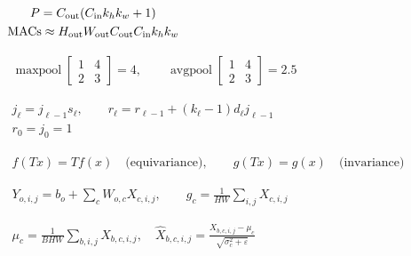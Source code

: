 \documentclass[border=4pt,multi=preview]{standalone}
\begin{document}
\begin{preview}\color{ink}\fontsize{24}{30}\selectfont
$\displaystyle \begin{gathered}P=C_{\rm out}(C_{\rm in}k_hk_w+1)\\\operatorname{MACs}\approx H_{\rm out}W_{\rm out}C_{\rm out}C_{\rm in}k_hk_w\end{gathered}$
\end{preview}
\begin{preview}\color{ink}\fontsize{24}{30}\selectfont
$\displaystyle \begin{gathered}\operatorname{maxpool}\!\begin{bmatrix}1&4\\2&3\end{bmatrix}=4,\qquad\operatorname{avgpool}\!\begin{bmatrix}1&4\\2&3\end{bmatrix}=2.5\end{gathered}$
\end{preview}
\begin{preview}\color{ink}\fontsize{24}{30}\selectfont
$\displaystyle \begin{gathered}j_\ell=j_{\ell-1}s_\ell,\qquad r_\ell=r_{\ell-1}+(k_\ell-1)d_\ell j_{\ell-1}\\r_0=j_0=1\end{gathered}$
\end{preview}
\begin{preview}\color{ink}\fontsize{24}{30}\selectfont
$\displaystyle \begin{gathered}f(Tx)=T f(x)\quad\text{(equivariance)},\qquad g(Tx)=g(x)\quad\text{(invariance)}\end{gathered}$
\end{preview}
\begin{preview}\color{ink}\fontsize{24}{30}\selectfont
$\displaystyle \begin{gathered}Y_{o,i,j}=b_o+\sum_c W_{o,c}X_{c,i,j},\qquad g_c=\frac1{HW}\sum_{i,j}X_{c,i,j}\end{gathered}$
\end{preview}
\begin{preview}\color{ink}\fontsize{24}{30}\selectfont
$\displaystyle \begin{gathered}\mu_c=\frac1{BHW}\sum_{b,i,j}X_{b,c,i,j},\quad\hat X_{b,c,i,j}=\frac{X_{b,c,i,j}-\mu_c}{\sqrt{\sigma_c^2+\varepsilon}}\end{gathered}$
\end{preview}
\end{document}
